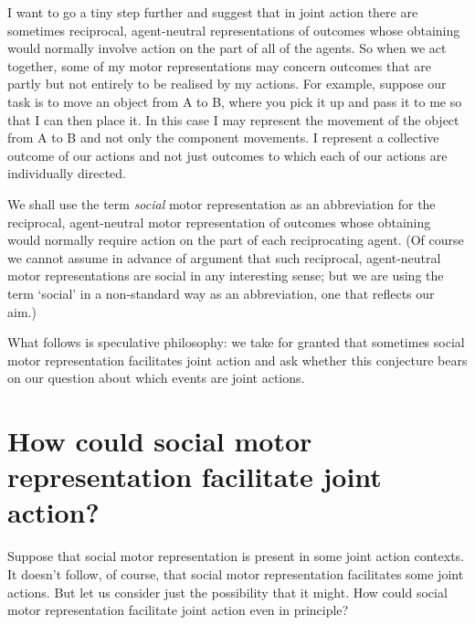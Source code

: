 \documentclass[12pt,\papersize]{extarticle}
\begin{document}
I want to go a tiny step further and suggest that in joint action there are sometimes reciprocal, agent-neutral representations of outcomes whose obtaining would normally involve action on the part of all of the agents.
So when we act together, some of my motor representations may concern outcomes that are partly but not entirely to be realised by my actions.
For example, suppose our task is to move an object from A to B, where you pick it up and pass it to me so that I can then place it.
In this case I may represent the movement of the object from A to B and not only the component movements.
I represent a collective outcome of our actions and not just outcomes to which each of our actions are individually directed.
%

We shall use the term \emph{social} motor representation as an abbreviation for the reciprocal, agent-neutral motor representation of outcomes whose obtaining would normally require action on the part of each reciprocating agent.
(Of course we cannot assume in advance of argument that such reciprocal, agent-neutral motor representations are social in any interesting sense;
but we are using the term `social' in a non-standard way as an abbreviation, one that reflects our aim.)

What follows is speculative philosophy: we take for granted that sometimes social motor representation facilitates joint action and ask whether this conjecture bears on our question about which events are joint actions.


\section{How could social motor representation facilitate joint action?}
Suppose that social motor representation is present in some joint action contexts.
It doesn't follow, of course, that social motor representation facilitates some joint actions.
But let us consider just the possibility that it might.
How could social motor representation facilitate joint action even in principle?
\end{document}
